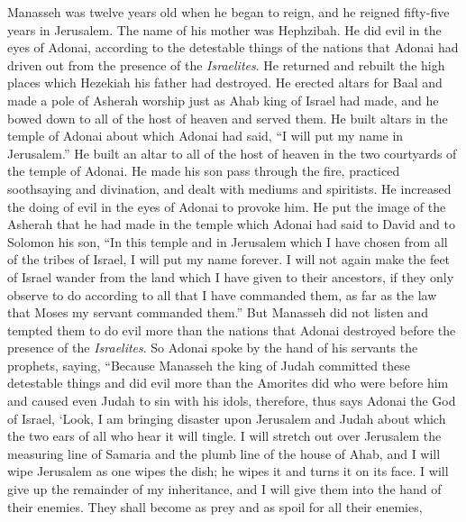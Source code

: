 \begin{biblechapter} %
 Manasseh was twelve years old when he began to reign, and he reigned fifty-five years in Jerusalem. The name of his mother was Hephzibah.
\verse He did evil in the eyes of Adonai, according to the detestable things of the nations that Adonai had driven out from the presence of the \textit{Israelites}.
\verse He returned and rebuilt the high places which Hezekiah his father had destroyed. He erected altars for Baal and made a pole of Asherah worship just as Ahab king of Israel had made, and he bowed down to all of the host of heaven and served them.
\verse He built altars in the temple of Adonai about which Adonai had said, “I will put my name in Jerusalem.”
\verse He built an altar to all of the host of heaven in the two courtyards of the temple of Adonai.
\verse He made his son pass through the fire, practiced soothsaying and divination, and dealt with mediums and spiritists. He increased the doing of evil in the eyes of Adonai to provoke him.
\verse He put the image of the Asherah that he had made in the temple which Adonai had said to David and to Solomon his son, “In this temple and in Jerusalem which I have chosen from all of the tribes of Israel, I will put my name forever.
\verse I will not again make the feet of Israel wander from the land which I have given to their ancestors, if they only observe to do according to all that I have commanded them, as far as the law that Moses my servant commanded them.”
\verse But Manasseh did not listen and tempted them to do evil more than the nations that Adonai destroyed before the presence of the \textit{Israelites}.
 So Adonai spoke by the hand of his servants the prophets, saying,
\verse “Because Manasseh the king of Judah committed these detestable things and did evil more than the Amorites did who were before him and caused even Judah to sin with his idols,
\verse therefore, thus says Adonai the God of Israel, ‘Look, I am bringing disaster upon Jerusalem and Judah about which the two ears of all who hear it will tingle.
\verse I will stretch out over Jerusalem the measuring line of Samaria and the plumb line of the house of Ahab, and I will wipe Jerusalem as one wipes the dish; he wipes it and turns it on its face.
\verse I will give up the remainder of my inheritance, and I will give them into the hand of their enemies. They shall become as prey and as spoil for all their enemies,

\end{biblechapter}
